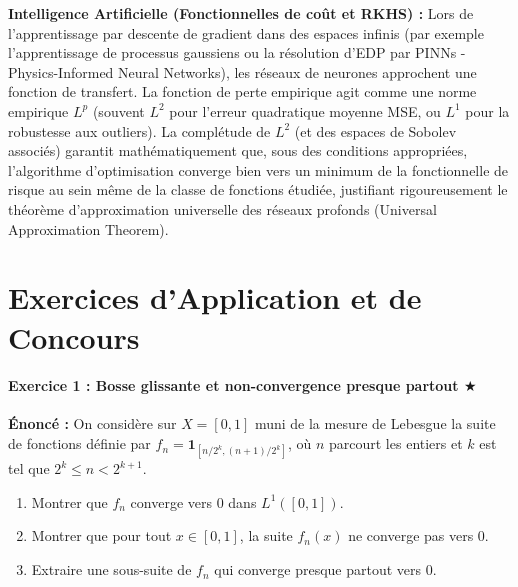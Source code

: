 \documentclass[11pt,a4paper]{article}
\begin{document}
\textbf{Intelligence Artificielle (Fonctionnelles de coût et RKHS) :}
Lors de l'apprentissage par descente de gradient dans des espaces infinis (par exemple l'apprentissage de processus gaussiens ou la résolution d'EDP par PINNs - Physics-Informed Neural Networks), les réseaux de neurones approchent une fonction de transfert. La fonction de perte empirique agit comme une norme empirique $L^p$ (souvent $L^2$ pour l'erreur quadratique moyenne MSE, ou $L^1$ pour la robustesse aux outliers). La complétude de $L^2$ (et des espaces de Sobolev associés) garantit mathématiquement que, sous des conditions appropriées, l'algorithme d'optimisation converge bien vers un minimum de la fonctionnelle de risque au sein même de la classe de fonctions étudiée, justifiant rigoureusement le théorème d'approximation universelle des réseaux profonds (Universal Approximation Theorem).


\part{Exercices d'Application et de Concours}
\subsection*{Exercice 1 : Bosse glissante et non-convergence presque partout \quad $\bigstar$}
\textbf{Énoncé :}
On considère sur $X = [0,1]$ muni de la mesure de Lebesgue la suite de fonctions définie par $f_n = \mathbf{1}_{[n/2^k, (n+1)/2^k]}$, où $n$ parcourt les entiers et $k$ est tel que $2^k \le n < 2^{k+1}$.
\begin{enumerate}
\item Montrer que $f_n$ converge vers $0$ dans $L^1([0,1])$.
\item Montrer que pour tout $x \in [0,1]$, la suite $f_n(x)$ ne converge pas vers $0$.
\item Extraire une sous-suite de $f_n$ qui converge presque partout vers $0$.
\end{enumerate}
\end{document}

